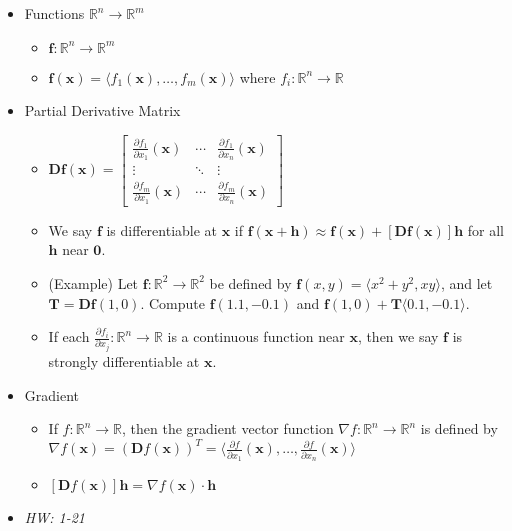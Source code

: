 \documentclass[11pt]{article}
\theoremstyle{plain}
\theoremstyle{definition}
\theoremstyle{remark}
\newcommand{\vect}[1]{\mathbf{#1}}
\newcommand{\<}{\langle}
\renewcommand{\>}{\rangle}
\newcommand{\p}{\partial}
\newcommand{\mb}{\mathbb}
\begin{document}
\begin{itemize}
  \item Functions \(\mb R^n\to\mb R^m\)
    \begin{itemize}
      \item \(\vect{f}:\mb R^n\to\mb R^m\)
      \item
        \(
          \vect{f}(\vect{x})
            =
          \<f_1(\vect{x}),\dots,f_m(\vect{x})\>
        \) where \(f_i:\mb R^n\to \mb R\)
    \end{itemize}
  \item Partial Derivative Matrix
    \begin{itemize}
      \item
        \(\displaystyle
          \vect{D}\vect{f}(\vect{x})
            =
          \begin{bmatrix}
            \frac{\p f_1}{\p x_1}(\vect x) &
            \cdots &
            \frac{\p f_1}{\p x_n}(\vect x)
            \\
            \vdots & \ddots & \vdots
            \\
            \frac{\p f_m}{\p x_1}(\vect x) &
            \cdots &
            \frac{\p f_m}{\p x_n}(\vect x)
          \end{bmatrix}
        \)
      \item
        We say \(\vect f\) is differentiable at \(\vect{x}\) if
        \(
          \vect{f}(\vect x+\vect h)
            \approx
          \vect{f}(\vect x)+[\vect{D}\vect{f}(\vect{x})]\vect{h}
        \)
        for all \(\vect h\) near \(\vect 0\).
      \item (Example) Let \(\vect f:\mb R^2\to\mb R^2\) be defined by
        \(\vect f(x,y)=\<x^2+y^2,xy\>\), and let
        \(\vect{T}=\vect{D}\vect{f}(1,0)\). Compute
        \(\vect{f}(1.1,-0.1)\) and \(\vect{f}(1,0)+\vect{T}\<0.1,-0.1\>\).
      \item If each \(\frac{\p f_i}{\p x_j}:\mb R^n\to\mb R\)
        is a continuous function near \(\vect x\), then we say \(\vect{f}\)
        is strongly differentiable at \(\vect x\).
    \end{itemize}
  \item Gradient
    \begin{itemize}
      \item If \(f:\mb R^n\to\mb R\), then the gradient vector function
        \(\nabla f:\mb R^n\to\mb R^n\) is defined by
        \(
          \nabla f(\vect x)
            =
          (\vect D f(\vect x))^T
            =
          \<\frac{\p f}{\p x_1}(\vect x),\dots,\frac{\p f}{\p x_n}(\vect x)\>
        \)
      \item
        \(
          [\vect D f(\vect x)]\vect h
            =
          \nabla f(\vect x) \cdot \vect h
        \)
    \end{itemize}
  \item\textit{
    HW: 1-21
  }
\end{itemize}
\end{document}
